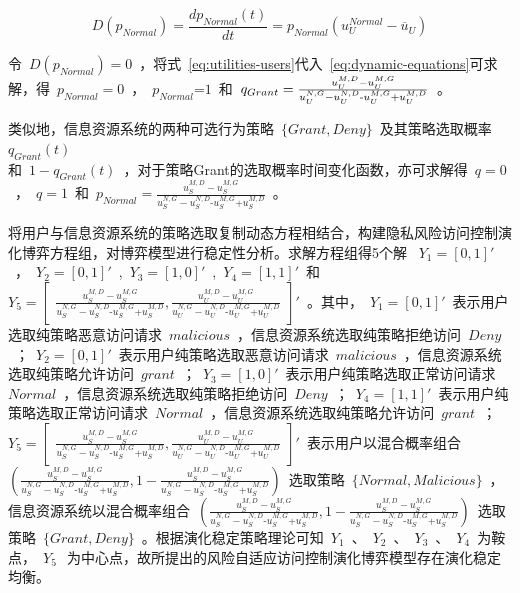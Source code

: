 \begin{equation}\label{eq:dynamic-equations}
D({{p}_{Normal}})=\frac{d{{p}_{Normal}}(t)}{dt}={{p}_{Normal}}(u_{U}^{Normal}-{{\overline{u}}_{U}})
\end{equation}

 令~$D({{p}_{Normal}})=0$~，将式~\ref{eq:utilities-users}代入~\ref{eq:dynamic-equations}可求解，得~${{p}_{Normal}}=0$~，~${{p}_{Normal}}\text{=}1$~和~${{q}_{Grant}}=\\\frac{u_{U}^{M,D}-u_{U}^{M,G}}{u_{U}^{N,G}-u_{U}^{N,D}\text{-}u_{U}^{M,G}\text{+}u_{U}^{M,D}}$~。
 
 类似地，信息资源系统的两种可选行为策略~$\{Grant,Deny\}$~及其策略选取概率~$q_{Grant}(t)~$\\和~$1-q_{Grant}(t)$~，对于策略Grant的选取概率时间变化函数，亦可求解得~$q=0$~，~$q=1$~和~${{p}_{Normal}}=\frac{u_{S}^{M,D}-u_{S}^{M,G}}{u_{S}^{N,G}-u_{S}^{N,D}\text{-}u_{S}^{M,G}\text{+}u_{S}^{M,D}}$~。

将用户与信息资源系统的策略选取复制动态方程相结合，构建隐私风险访问控制演化博弈方程组，对博弈模型进行稳定性分析。求解方程组得5个解 ~${{Y}_{1}}=[0,1]'$~，~${{Y}_{2}}=\left[ 0 ,1 \right]'$~,~${{Y}_{3}}=\left[1 ,0 \right]'$~,~${{Y}_{4}}=\left[ 1 ,1 \right]'$~和~${{Y}_{5}}=
\begin{bmatrix}
\frac{u_{S}^{M,D}-u_{S}^{M,G}}{u_{S}^{N,G}-u_{S}^{N,D}\text{-}u_{S}^{M,G}\text{+}u_{S}^{M,D}},
\frac{u_{U}^{M,D}-u_{U}^{M,G}}{u_{U}^{N,G}-u_{U}^{N,D}\text{-}u_{U}^{M,G}\text{+}u_{U}^{M,D}}
\end{bmatrix}'$~。其中，~${{Y}_{1}}=[0,1]'$~表示用户选取纯策略恶意访问请求~$malicious$~，信息资源系统选取纯策略拒绝访问~$Deny$~；~${{Y}_{2}}=\left[ 0 ,1 \right]'$~表示用户纯策略选取恶意访问请求~$malicious$~，信息资源系统选取纯策略允许访问~$grant$~；~${{Y}_{3}}=\left[1 ,0 \right]'$~表示用户纯策略选取正常访问请求~$Normal$~，信息资源系统选取纯策略拒绝访问~$Deny$~；~${{Y}_{4}}=\left[ 1 ,1 \right]'$~表示用户纯策略选取正常访问请求~$Normal$~，信息资源系统选取纯策略允许访问~$grant$~；~${{Y}_{5}}=
\begin{bmatrix}
\frac{u_{S}^{M,D}-u_{S}^{M,G}}{u_{S}^{N,G}-u_{S}^{N,D}\text{-}u_{S}^{M,G}\text{+}u_{S}^{M,D}},
\frac{u_{U}^{M,D}-u_{U}^{M,G}}{u_{U}^{N,G}-u_{U}^{N,D}\text{-}u_{U}^{M,G}\text{+}u_{U}^{M,D}}
\end{bmatrix}'$~表示用户以混合概率组合~$( \frac{u_{S}^{M,D}-u_{S}^{M,G}}{u_{S}^{N,G}-u_{S}^{N,D}\text{-}u_{S}^{M,G}\text{+}u_{S}^{M,D}}, 1- \frac{u_{S}^{M,D}-u_{S}^{M,G}}{u_{S}^{N,G}-u_{S}^{N,D}\text{-}u_{S}^{M,G}\text{+}u_{S}^{M,D}})$~选取策略~$\{Normal, Malicious\}$~，信息资源系统以混合概率组合~$(\frac{u_{S}^{M,D}-u_{S}^{M,G}}{u_{S}^{N,G}-u_{S}^{N,D}\text{-}u_{S}^{M,G}\text{+}u_{S}^{M,D}} , 1-\frac{u_{S}^{M,D}-u_{S}^{M,G}}{u_{S}^{N,G}-u_{S}^{N,D}\text{-}u_{S}^{M,G}\text{+}u_{S}^{M,D}} )$~选取策略~$\{Grant, Deny\}$~。根据演化稳定策略理论可知~$Y_1$~、~$Y_2$~、~$Y_3$~、~$Y_4$~为鞍点，~$Y_5~$~为中心点，故所提出的风险自适应访问控制演化博弈模型存在演化稳定均衡。

